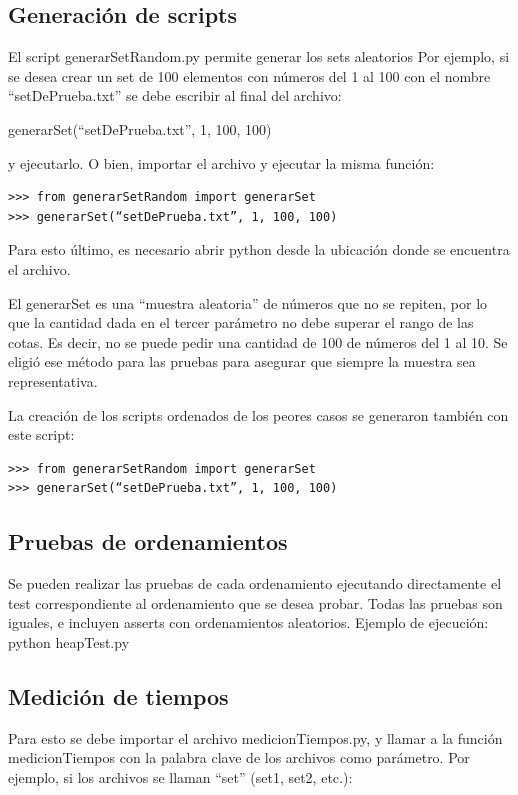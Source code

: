 \documentclass[titlepage,a4paper]{article}
\begin{document}
\subsection{Generación de scripts}
El script generarSetRandom.py permite generar los sets aleatorios Por ejemplo, si se desea crear un set de 100 elementos con números del 1 al 100 con el nombre “setDePrueba.txt” se debe escribir al final del archivo:

generarSet(“setDePrueba.txt”, 1, 100, 100)

y ejecutarlo. O bien, importar el archivo y ejecutar la misma función:

\begin{verbatim}
>>> from generarSetRandom import generarSet
>>> generarSet(“setDePrueba.txt”, 1, 100, 100)
\end{verbatim}

Para esto último, es necesario abrir python desde la ubicación donde se encuentra el archivo.

El generarSet es una “muestra aleatoria” de números que no se repiten,  por lo que la cantidad dada en el tercer parámetro no debe superar el rango de las cotas. Es decir, no se puede pedir una cantidad de 100 de números del 1 al 10. Se eligió ese método para las pruebas para asegurar que siempre la muestra sea representativa. 

La creación de los scripts ordenados de los peores casos se generaron también con este script:
\begin{verbatim}
>>> from generarSetRandom import generarSet
>>> generarSet(“setDePrueba.txt”, 1, 100, 100)
\end{verbatim}

\subsection{Pruebas de ordenamientos}
Se pueden realizar las pruebas de cada ordenamiento ejecutando directamente el test correspondiente al ordenamiento que se desea probar. Todas las pruebas son iguales, e incluyen asserts con ordenamientos aleatorios.
Ejemplo de ejecución: python heapTest.py

\subsection{Medición de tiempos}
Para esto se debe importar el archivo medicionTiempos.py, y  llamar a la función medicionTiempos con la palabra clave de los archivos como parámetro. Por ejemplo, si los archivos se llaman “set” (set1, set2, etc.):
\end{document}
